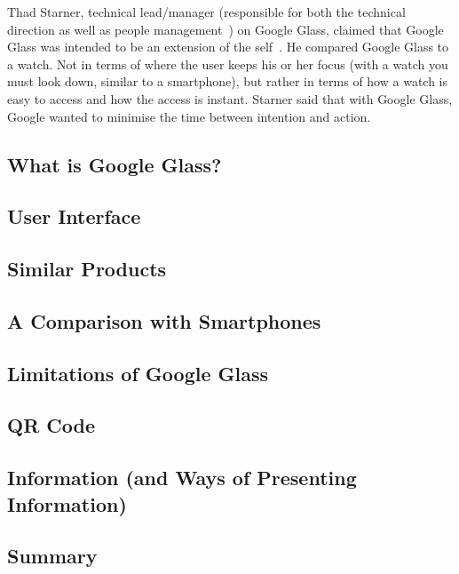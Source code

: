 Thad Starner, technical lead/manager (responsible for both the technical direction as well as people management~\cite{techLeadManager}) on Google Glass, claimed that Google Glass was intended to be an extension of the self~\cite{6504855}. He compared Google Glass to a watch. Not in terms of where the user keeps his or her focus (with a watch you must look down, similar to a smartphone), but rather in terms of how a watch is easy to access and how the access is instant. Starner said that with Google Glass, Google wanted to minimise the time between intention and action. 
%
\subsection{What is Google Glass?}
\label{subsec:googleglass}

%
\subsection{User Interface}
\label{subsec:userinterface}

%
\subsection{Similar Products}
\label{subsec:similarproducts}

%
\subsection{A Comparison with Smartphones}
\label{comparedtophones}

%
\subsection{Limitations of Google Glass}
\label{subsec:limitations}

%
\subsection{QR Code}
\label{subsec:qrcode}

%
\subsection{Information (and Ways of Presenting Information)}
\label{subsec:information}

%
\newpage
\subsection{Summary}
\label{subsec:summary}

%
